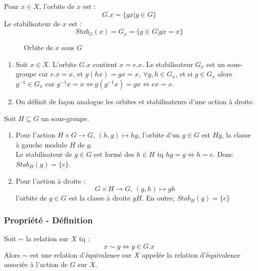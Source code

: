 \documentclass[a4paper, oneside]{report}
\theoremstyle{break}
\newcommand{\x}{\times}
\begin{document}
Pour $x\in X$, l'orbite de $x$ est :
$$G.x=\{gx | g\in G \}$$
Le stabilisateur de $x$ est :
$$Stab_G(x)=G_x=\{g\in G | gx=x \}$$

\begin{figure} [h]
	\begin{center}
		\caption{Orbite de $x$ sous $G$}
	\end{center}	
\end{figure}

\remar
\begin{enumerate}
\item Soit $x\in X$. L'orbite $G.x$ contient $x=e.x$. Le stabilisateur $G_x$ est un sous-groupe car $e.x=x$, et $g(hx)=gx=x,~\forall g,h\in G_x$, et si $g\in G_x$ alors $g^{-1}\in G_x$ car $g^{-1}x = x \Leftrightarrow g(g^{-1}x)=gx \Leftrightarrow ex = x$.
\item On définit de façon analogue les orbites et stabilisateurs d'une action à droite.
\end{enumerate}

\exem 
Soit $H\subseteq G$ un sous-groupe.
\begin{enumerate}
\item Pour l'action $H\x G \rightarrow G,~(h,g)\mapsto hg$, l'orbite d'un $g\in G$ est $Hg$, la classe à gauche modulo $H$ de $g$.\\
Le stabilisateur de $g\in G$ est formé des $h\in H$ tq $hg=g \Leftrightarrow h=e$. Donc $Stab_H(g)=\{e\}$.\\
\item Pour l'action à droite :
$$G\x H \rightarrow G,~(g,h)\mapsto gh$$
l'orbite de $g\in G$ est la classe à droite $gH$. En outre, $Stab_H(g)=\{e\}$
\end{enumerate}

\subsubsection{Propriété - Définition}
Soit $\sim$ la relation sur $X$ tq :
$$x\sim y \Leftrightarrow y\in G.x$$
Alors $\sim$ est une relation d'équivalence sur $X$ appelée la relation d'équivalence associée à l'action de $G$ sur $X$.
\end{document}
